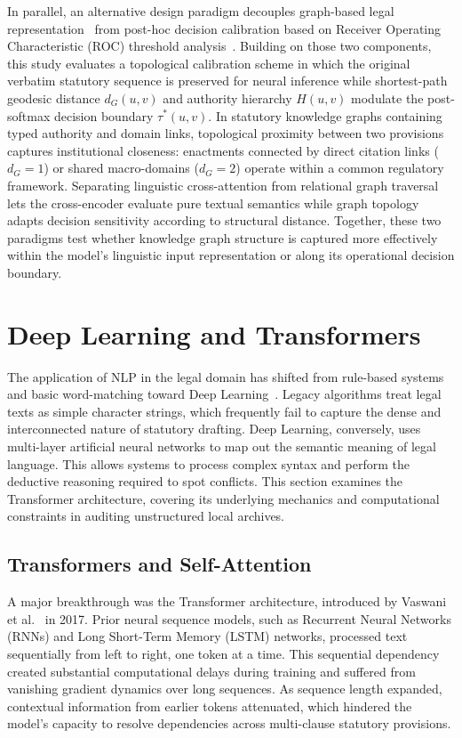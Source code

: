         In parallel, an alternative design paradigm decouples graph-based legal representation~\cite{ma2025gnn} from post-hoc decision calibration based on Receiver Operating Characteristic (ROC) threshold analysis~\cite{fawcett2006roc}. Building on those two components, this study evaluates a topological calibration scheme in which the original verbatim statutory sequence is preserved for neural inference while shortest-path geodesic distance $d_G(u, v)$ and authority hierarchy $H(u, v)$ modulate the post-softmax decision boundary $\tau^*(u, v)$. In statutory knowledge graphs containing typed authority and domain links, topological proximity between two provisions captures institutional closeness: enactments connected by direct citation links ($d_G = 1$) or shared macro-domains ($d_G = 2$) operate within a common regulatory framework. Separating linguistic cross-attention from relational graph traversal lets the cross-encoder evaluate pure textual semantics while graph topology adapts decision sensitivity according to structural distance. Together, these two paradigms test whether knowledge graph structure is captured more effectively within the model's linguistic input representation or along its operational decision boundary.

\section{Deep Learning and Transformers}
The application of NLP in the legal domain has shifted from rule-based systems and basic word-matching toward Deep Learning~\cite{katz_2023_legal_nlp}. Legacy algorithms treat legal texts as simple character strings, which frequently fail to capture the dense and interconnected nature of statutory drafting. Deep Learning, conversely, uses multi-layer artificial neural networks to map out the semantic meaning of legal language. This allows systems to process complex syntax and perform the deductive reasoning required to spot conflicts. This section examines the Transformer architecture, covering its underlying mechanics and computational constraints in auditing unstructured local archives.

    \subsection{Transformers and Self-Attention}
    A major breakthrough was the Transformer architecture, introduced by Vaswani et al.~\cite{vaswani2017attention} in 2017. Prior neural sequence models, such as Recurrent Neural Networks (RNNs) and Long Short-Term Memory (LSTM) networks, processed text sequentially from left to right, one token at a time. This sequential dependency created substantial computational delays during training and suffered from vanishing gradient dynamics over long sequences. As sequence length expanded, contextual information from earlier tokens attenuated, which hindered the model's capacity to resolve dependencies across multi-clause statutory provisions. 
    
